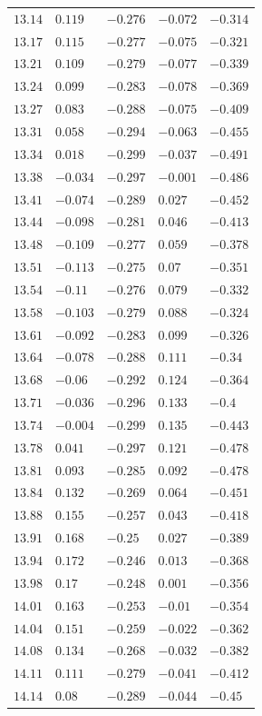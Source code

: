 \begin{center}
\begin{longtable}{lllll}
$13.14$&$0.119$&$-0.276$&$-0.072$&$-0.314$\\
$13.17$&$0.115$&$-0.277$&$-0.075$&$-0.321$\\
$13.21$&$0.109$&$-0.279$&$-0.077$&$-0.339$\\
$13.24$&$0.099$&$-0.283$&$-0.078$&$-0.369$\\
$13.27$&$0.083$&$-0.288$&$-0.075$&$-0.409$\\
$13.31$&$0.058$&$-0.294$&$-0.063$&$-0.455$\\
$13.34$&$0.018$&$-0.299$&$-0.037$&$-0.491$\\
$13.38$&$-0.034$&$-0.297$&$-0.001$&$-0.486$\\
$13.41$&$-0.074$&$-0.289$&$0.027$&$-0.452$\\
$13.44$&$-0.098$&$-0.281$&$0.046$&$-0.413$\\
$13.48$&$-0.109$&$-0.277$&$0.059$&$-0.378$\\
$13.51$&$-0.113$&$-0.275$&$0.07$&$-0.351$\\
$13.54$&$-0.11$&$-0.276$&$0.079$&$-0.332$\\
$13.58$&$-0.103$&$-0.279$&$0.088$&$-0.324$\\
$13.61$&$-0.092$&$-0.283$&$0.099$&$-0.326$\\
$13.64$&$-0.078$&$-0.288$&$0.111$&$-0.34$\\
$13.68$&$-0.06$&$-0.292$&$0.124$&$-0.364$\\
$13.71$&$-0.036$&$-0.296$&$0.133$&$-0.4$\\
$13.74$&$-0.004$&$-0.299$&$0.135$&$-0.443$\\
$13.78$&$0.041$&$-0.297$&$0.121$&$-0.478$\\
$13.81$&$0.093$&$-0.285$&$0.092$&$-0.478$\\
$13.84$&$0.132$&$-0.269$&$0.064$&$-0.451$\\
$13.88$&$0.155$&$-0.257$&$0.043$&$-0.418$\\
$13.91$&$0.168$&$-0.25$&$0.027$&$-0.389$\\
$13.94$&$0.172$&$-0.246$&$0.013$&$-0.368$\\
$13.98$&$0.17$&$-0.248$&$0.001$&$-0.356$\\
$14.01$&$0.163$&$-0.253$&$-0.01$&$-0.354$\\
$14.04$&$0.151$&$-0.259$&$-0.022$&$-0.362$\\
$14.08$&$0.134$&$-0.268$&$-0.032$&$-0.382$\\
$14.11$&$0.111$&$-0.279$&$-0.041$&$-0.412$\\
$14.14$&$0.08$&$-0.289$&$-0.044$&$-0.45$\\

\end{longtable}
\end{center}
